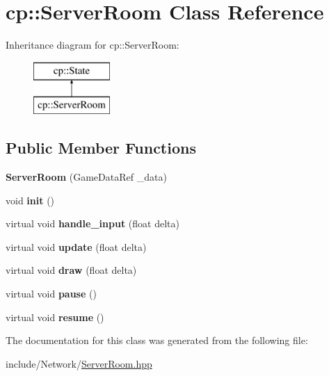 \hypertarget{classcp_1_1_server_room}{}\section{cp\+:\+:Server\+Room Class Reference}
\label{classcp_1_1_server_room}
Inheritance diagram for cp\+:\+:Server\+Room\+:\begin{figure}[H]
\begin{center}
\leavevmode
\includegraphics[height=2.000000cm]{classcp_1_1_server_room}
\end{center}
\end{figure}
\subsection*{Public Member Functions}
\begin{DoxyCompactItemize}
\item 
\mbox{\label{classcp_1_1_server_room_ac11f8f51d5242b796f79e042b7918541}} 
{\bfseries Server\+Room} (Game\+Data\+Ref \+\_\+data)
\item 
\mbox{\label{classcp_1_1_server_room_adc9e2fe2c4a6e59d7b33744470b71b85}} 
void {\bfseries init} ()
\item 
\mbox{\label{classcp_1_1_server_room_a0330143a408d7956e746795c21c143ff}} 
virtual void {\bfseries handle\+\_\+input} (float delta)
\item 
\mbox{\label{classcp_1_1_server_room_a561b8c66d9cd87e59c5f309d45bad6d1}} 
virtual void {\bfseries update} (float delta)
\item 
\mbox{\label{classcp_1_1_server_room_af27b01b2d8e93b5d14df8a60b9220e79}} 
virtual void {\bfseries draw} (float delta)
\item 
\mbox{\label{classcp_1_1_server_room_af645f2f2b9bb1cd10b60df3b2fb4f596}} 
virtual void {\bfseries pause} ()
\item 
\mbox{\label{classcp_1_1_server_room_ae3f282bcaf70b6ab8b5b6e2f3e05a66b}} 
virtual void {\bfseries resume} ()
\end{DoxyCompactItemize}


The documentation for this class was generated from the following file\+:\begin{DoxyCompactItemize}
\item 
include/\+Network/\hyperlink{_server_room_8hpp}{Server\+Room.\+hpp}\end{DoxyCompactItemize}
